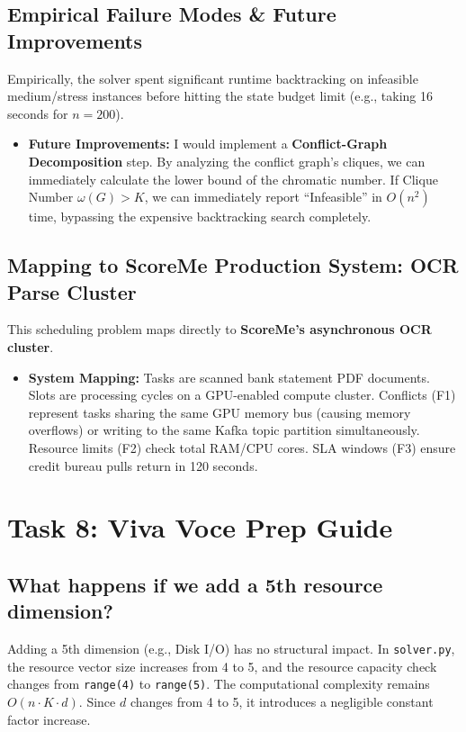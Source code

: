 \documentclass[11pt,a4paper]{article}
\begin{document}
\subsection{Empirical Failure Modes \& Future Improvements}
Empirically, the solver spent significant runtime backtracking on infeasible medium/stress instances before hitting the state budget limit (e.g., taking 16 seconds for $n=200$).
\begin{itemize}
    \item \textbf{Future Improvements:} I would implement a \textbf{Conflict-Graph Decomposition} step. By analyzing the conflict graph's cliques, we can immediately calculate the lower bound of the chromatic number. If Clique Number $\omega(G) > K$, we can immediately report ``Infeasible'' in $O(n^2)$ time, bypassing the expensive backtracking search completely.
\end{itemize}

\subsection{Mapping to ScoreMe Production System: OCR Parse Cluster}
This scheduling problem maps directly to \textbf{ScoreMe's asynchronous OCR cluster}.
\begin{itemize}
    \item \textbf{System Mapping:} Tasks are scanned bank statement PDF documents. Slots are processing cycles on a GPU-enabled compute cluster. Conflicts (F1) represent tasks sharing the same GPU memory bus (causing memory overflows) or writing to the same Kafka topic partition simultaneously. Resource limits (F2) check total RAM/CPU cores. SLA windows (F3) ensure credit bureau pulls return in 120 seconds.
\end{itemize}

\newpage

\section{Task 8: Viva Voce Prep Guide}

\subsection{What happens if we add a 5th resource dimension?}
Adding a 5th dimension (e.g., Disk I/O) has no structural impact. In \texttt{solver.py}, the resource vector size increases from 4 to 5, and the resource capacity check changes from \texttt{range(4)} to \texttt{range(5)}. The computational complexity remains $O(n \cdot K \cdot d)$. Since $d$ changes from 4 to 5, it introduces a negligible constant factor increase.
\end{document}
